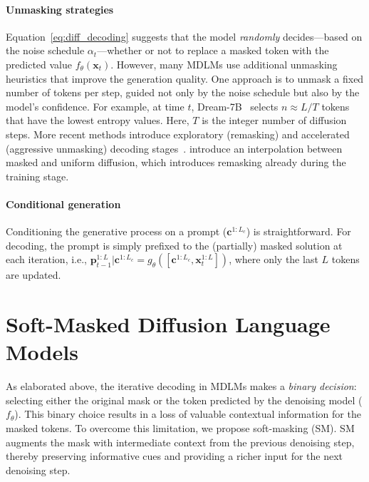 \documentclass{article}
\begin{document}
\paragraph{Unmasking strategies} 
Equation~\ref{eq:diff_decoding} suggests that the model \emph{randomly} decides---based on the noise schedule $\alpha_t$---whether or not to replace a masked token with the predicted value $f_\theta(\mathbf{x}_t)$.
% 
However, many MDLMs use additional unmasking heuristics that improve the generation quality.  
%
One approach is to unmask a fixed number of tokens per step, guided not only by the noise schedule but also by the model's confidence.
% 
For example, at time $t$,  Dream-7B~\citep{ye_dream_2025} selects $n\approx L/T$ tokens that have the lowest entropy values. Here, $T$ is the integer number of diffusion steps.
%
More recent methods introduce exploratory (remasking) and accelerated (aggressive unmasking) decoding stages~\citep{wei_accelerating_2025, wang_remasking_2025}. 
% 
\citet{rutte_generalized_2025} introduce an interpolation between masked and uniform diffusion, which introduces remasking already during the training stage. 

\paragraph{Conditional generation} Conditioning the generative process on a prompt ($\mathbf{c}^{1:L_c}$) is straightforward. 
% 
For decoding, the prompt is simply prefixed to the (partially) masked solution at each iteration, i.e., $\mathbf{p}^{1:L}_{t-1}|\mathbf{c}^{1:L_c} = g_\theta ([\mathbf{c}^{1:L_c}, \mathbf{x}^{1:L}_t])$, where only the last $L$ tokens are updated. 


\section{Soft-Masked Diffusion Language Models}\label{sec:method}

As elaborated above, the iterative decoding in MDLMs makes a \emph{binary decision}: selecting either the original mask or the token predicted by the denoising model ($f_\theta$). 
% 
This binary choice results in a loss of valuable contextual information for the masked tokens.
% 
To overcome this limitation, we propose soft-masking (SM). SM augments the mask with intermediate context from the previous denoising step, thereby preserving informative cues and providing a richer input for the next denoising step.
\end{document}
